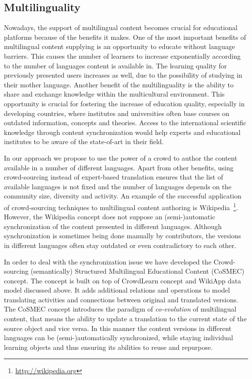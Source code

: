 \documentclass[ngerman,UKenglish,table]{scrbook}
\begin{document}
\subsection{Multilinguality}

Nowadays, the support of multilingual content becomes crucial for educational platforms because of the benefits it makes. %
One of the most important benefits of multilingual content supplying is an opportunity to educate without language barriers.
This causes the number of learners to increase exponentially according to the number of languages content is available in.
The learning quality for previously presented users increases as well, due to the possibility of studying in their mother language.
Another benefit of the multilinguality is the ability to share and exchange knowledge within the multicultural environment.
This opportunity is crucial for fostering the increase of  education quality, especially in developing countries, where institutes and universities often base courses on outdated information, concepts and theories.
Access to the international scientific knowledge through content synchronization would help experts and educational institutes to be aware of  the state-of-art in their field.

In our approach we propose to use the power of a crowd to author the content available in a number of different languages. 
Apart from other benefits, using crowd-sourcing instead of expert-based translation ensures that the list of available languages is not fixed and the number of languages depends on the community size, diversity and activity.
An example of  the successful application of crowd-sourcing techniques to multilingual content authoring is Wikipedia~\footnote{\url{http://wikipedia.org}}.
However, the Wikipedia concept does not suppose an (semi-)automatic synchronization of the content presented in different languages.
Although  synchronization is sometimes being done manually by contributors, the versions in different languages often stay outdated or even contradictory to each other.

In order to deal with the synchronization issue we have developed the Crowd-sourcing (semantically) Structured Multilingual Educational Content (CoSMEC) concept.
The concept is built on top of CrowdLearn concept and WikiApp data model discussed above.
It adds additional relations and operations to model translating activities and connections between original and translated versions.
The CoSMEC concept introduces the paradigm of \emph{co-evolution} of multilingual content, that means the ability to update a translation to the current state of the source object and vice versa. 
In this manner the content versions in different languages can be (semi-)automatically synchronized, while staying individual learning objects and thus ensuring its abilities to reuse and repurpose. 
\end{document}

